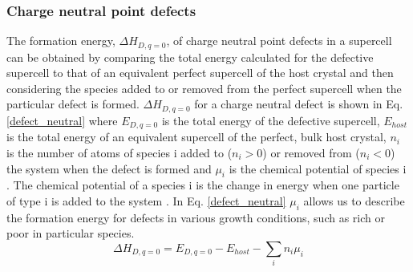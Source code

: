 \documentclass[11pt, twoside]{report}
\begin{document}
\subsubsection{Charge neutral point defects}
The formation energy, $\Delta H_{D,q=0}$, of charge neutral point defects in a supercell can be obtained by comparing the total energy calculated for the defective supercell to that of an equivalent perfect supercell of the host crystal and then considering the species added to or removed from the perfect supercell when the particular defect is formed. $\Delta H_{D,q=0}$ for a charge neutral defect is shown in Eq. \ref{defect_neutral} where $E_{D,q=0}$ is the total energy of the defective supercell, $E_{host}$ is the total energy of an equivalent supercell of the perfect, bulk host crystal, $n_i$ is the number of atoms of species i added to ($n_i > 0 $) or removed from ($n_i < 0$) the system when the defect is formed and $\mu_i$ is the chemical potential of species i \cite{ZhangNorthup_defect_formation}. The chemical potential of a species i is the change in energy when one particle of type i is added to the system \cite{chem_pot}. In Eq. \ref{defect_neutral} $\mu_i$ allows us to describe the formation energy for defects in various growth conditions, such as rich or poor in particular species.
\begin{equation}\label{defect_neutral}
\Delta H_{D,q=0} = E_{D,q=0} - E_{host} - \sum_i n_i \mu_i
\end{equation}
\end{document}
